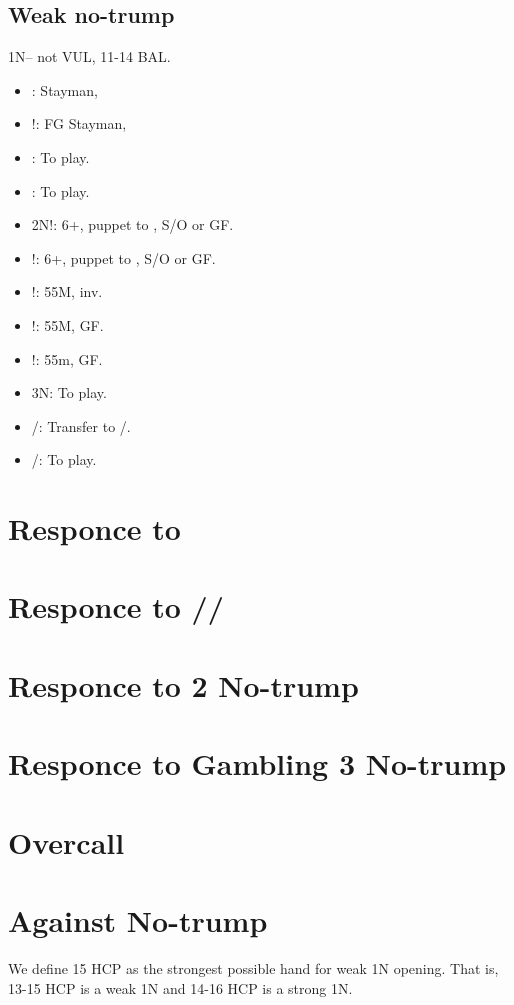 \documentclass[12pt,twoside,a5paper]{report}%
\begin{document}
	\section*{Weak no-trump}
	1N-- not VUL, 11-14 BAL.
	\begin{itemize}
	\renewcommand{\labelitemi}{}
	\item {}: Stayman,
	\item {}!: FG Stayman,
	\item {}: To play.
	\item {}: To play.
	\item 2N!: 6+\cl{}, puppet to , S/O or GF.
	\item {}!: 6+\di{}, puppet to , S/O or GF.
	\item {}!: 55M, inv.
	\item {}!: 55M, GF.
	\item {}!: 55m, GF.
	\item 3N: To play.
	\item {}/\di{}: Transfer to /\sp{}.
	\item {}/\sp{}: To play.
	\end{itemize}
\chapter*{Responce to }
\chapter*{Responce to /\he{}/\sp{}}
\chapter*{Responce to 2 No-trump}
\chapter*{Responce to Gambling 3 No-trump}
\chapter*{Overcall}
\chapter*{Against No-trump}
	We define 15 HCP as the strongest possible hand for weak 1N opening. That is, 13-15 HCP is a weak 1N and 14-16 HCP is a strong 1N. 
\end{document}
